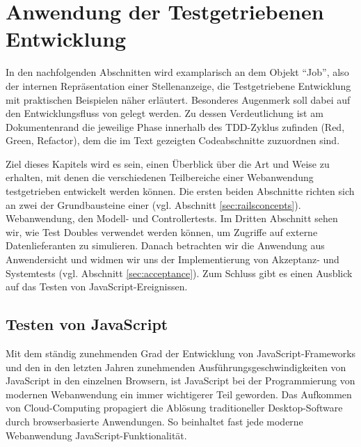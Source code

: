 \chapter{Anwendung der Testgetriebenen Entwicklung}
\label{sec:awtdd}

In den nachfolgenden Abschnitten wird examplarisch an dem Objekt "`Job"', also der internen Repräsentation einer Stellenanzeige, die Testgetriebene Entwicklung mit praktischen Beispielen näher erläutert.
Besonderes Augenmerk soll dabei auf den Entwicklungsfluss von  gelegt werden. Zu dessen Verdeutlichung ist am Dokumentenrand die jeweilige Phase innerhalb des TDD-Zyklus zufinden (Red, Green, Refactor), dem die im Text gezeigten Codeabschnitte zuzuordnen sind.

Ziel dieses Kapitels wird es sein, einen Überblick über die Art und Weise zu erhalten, mit denen die verschiedenen Teilbereiche einer Webanwendung testgetrieben entwickelt werden können.
Die ersten beiden Abschnitte richten sich an zwei der Grundbausteine einer  (vgl. Abschnitt \ref{sec:railsconcepts}).
Webanwendung, den Modell- und Controllertests. Im Dritten Abschnitt sehen wir, wie Test Doubles verwendet werden können, um Zugriffe auf externe Datenlieferanten zu simulieren. Danach betrachten wir die Anwendung aus Anwendersicht und widmen wir uns der Implementierung von Akzeptanz- und Systemtests (vgl. Abschnitt \ref{sec:acceptance}).
Zum Schluss gibt es einen Ausblick auf das Testen von JavaScript-Ereignissen.






\section{Testen von JavaScript}

Mit dem ständig zunehmenden Grad der Entwicklung von JavaScript-Frameworks und den in den letzten Jahren zunehmenden Ausführungsgeschwindigkeiten von JavaScript in den einzelnen Browsern, ist JavaScript bei der Programmierung von modernen Webanwendung ein immer wichtigerer Teil geworden. Das Aufkommen von Cloud-Computing propagiert die Ablösung traditioneller Desktop-Software durch browserbasierte Anwendungen. So beinhaltet fast jede moderne Webanwendung JavaScript-Funktionalität.

